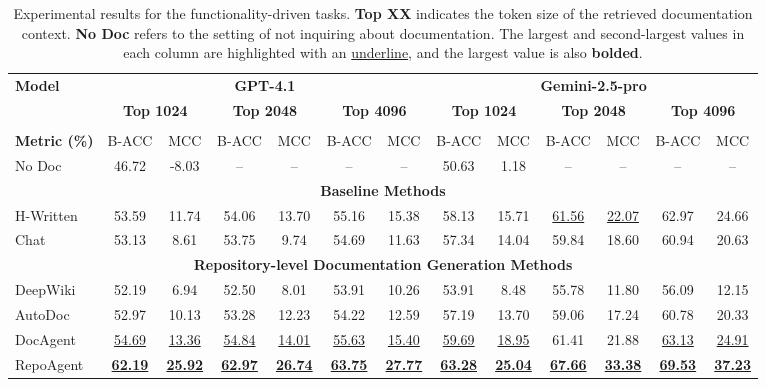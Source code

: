 \begin{table}[t]

\centering
\caption{Experimental results for the functionality-driven tasks. \textbf{Top XX} indicates the token size of the retrieved documentation context. \textbf{No Doc} refers to the setting of not inquiring about documentation. The largest and second-largest values in each column are highlighted with an \underline{underline}, and the largest value is also \textbf{bolded}.
}
\vspace{-1em}
\label{tab:rq1_results}
\setlength{\tabcolsep}{6.5pt}
\renewcommand{\arraystretch}{0.75}
\begin{tabular}{l|cc|cc|cc|cc|cc|cc}
\toprule
\multirow{2}{*}{\textbf{Model}} & \multicolumn{6}{c|}{\textbf{GPT-4.1}} & \multicolumn{6}{c}{\textbf{Gemini-2.5-pro}} \\
& \multicolumn{2}{c}{\textbf{Top 1024}} & \multicolumn{2}{c}{\textbf{Top 2048}} & \multicolumn{2}{c|}{\textbf{Top 4096}} & \multicolumn{2}{c}{\textbf{Top 1024}} & \multicolumn{2}{c}{\textbf{Top 2048}} & \multicolumn{2}{c}{\textbf{Top 4096}} \\ \midrule
\rowcolor{mygreen} \multicolumn{13}{c}{\textbf{Functionality Detection}} \\ \midrule
\rowcolor{gray!20} \textbf{Metric (\%)} & B-ACC & MCC & B-ACC & MCC & B-ACC & MCC & B-ACC & MCC & B-ACC & MCC & B-ACC & MCC \\
\midrule
No Doc            & 46.72 & -8.03 & -- & -- & -- & -- & 50.63 & 1.18 & -- & -- & -- & -- \\ \midrule
 \multicolumn{13}{c}{\textbf{Baseline Methods}} \\ \midrule
H-Written        & 53.59 & 11.74  & 54.06 & 13.70 & 55.16 & 15.38 & 58.13 & 15.71 & \underline{61.56} & \underline{22.07} & 62.97 & 24.66 \\
Chat       & 53.13 & 8.61 & 53.75 & 9.74 & 54.69 & 11.63 & 57.34 & 14.04 & 59.84 & 18.60 & 60.94 & 20.63 \\ \midrule

 \multicolumn{13}{c}{\textbf{Repository-level Documentation Generation Methods}} \\ \midrule
DeepWiki   & 52.19 & 6.94  & 52.50 & 8.01 & 53.91 & 10.26 & 53.91 & 8.48  & 55.78 & 11.80 & 56.09 & 12.15 \\
AutoDoc    & 52.97 & 10.13  & 53.28 & 12.23 & 54.22 & 12.59 & 57.19 & 13.70 & 59.06 & 17.24 & 60.78 & 20.33 \\
DocAgent   & \underline{54.69} & \underline{13.36} & \underline{54.84} & \underline{14.01} & \underline{55.63} & \underline{15.40} & \underline{59.69} & \underline{18.95} & 61.41 & 21.88 & \underline{63.13} & \underline{24.91} \\
    RepoAgent  & \underline{\textbf{62.19}} & \underline{\textbf{25.92}} & \underline{\textbf{62.97}} & \underline{\textbf{26.74}} & \underline{\textbf{63.75}} & \underline{\textbf{27.77}} & \underline{\textbf{63.28}} & \underline{\textbf{25.04}} & \underline{\textbf{67.66}} & \underline{\textbf{33.38}} & \underline{\textbf{69.53}} & \underline{\textbf{37.23}} \\


\end{tabular}
\end{table}
